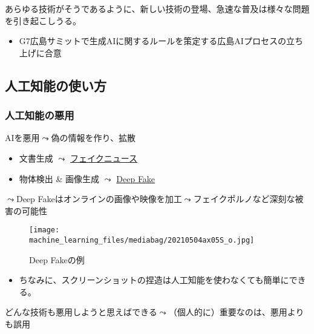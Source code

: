 \documentclass[
  xelatex,
  ja=standard]{bxjsarticle}
\providecommand{\tightlist}{%
  \setlength{\itemsep}{0pt}\setlength{\parskip}{0pt}}\usepackage{longtable,booktabs,array}
\begin{document}
あらゆる技術がそうであるように、新しい技術の登場、急速な普及は様々な問題を引き起こしうる。

\begin{itemize}
\tightlist
\item
  G7広島サミットで生成AIに関するルールを策定する広島AIプロセスの立ち上げに合意
\end{itemize}

\hypertarget{ux4ebaux5de5ux77e5ux80fdux306eux4f7fux3044ux65b9}{%
\subsection{人工知能の使い方}\label{ux4ebaux5de5ux77e5ux80fdux306eux4f7fux3044ux65b9}}

\hypertarget{ux4ebaux5de5ux77e5ux80fdux306eux60aaux7528}{%
\subsubsection{人工知能の悪用}\label{ux4ebaux5de5ux77e5ux80fdux306eux60aaux7528}}

AIを悪用\(\leadsto\)偽の情報を作り、拡散

\begin{itemize}
\tightlist
\item
  文書生成 \(\leadsto\)
  \href{https://www.itmedia.co.jp/business/articles/2007/29/news025_4.html}{フェイクニュース}
\item
  物体検出 \& 画像生成 \(\leadsto\)
  \href{https://wired.jp/2018/09/14/deepfake-fake-videos-ai/}{Deep Fake}
\end{itemize}

\(\leadsto\)Deep
Fakeはオンラインの画像や映像を加工\(\leadsto\)フェイクポルノなど深刻な被害の可能性

\begin{figure}[htpb]

{\centering \texttt{[image: machine\_learning\_files/mediabag/20210504ax05S\_o.jpg]}

}

\caption{Deep Fakeの例}

\end{figure}

\begin{itemize}
\tightlist
\item
  ちなみに、スクリーンショットの捏造は人工知能を使わなくても簡単にできる。
\end{itemize}

どんな技術も悪用しようと思えばできる\(\leadsto\)（個人的に）重要なのは、悪用よりも誤用
\end{document}
